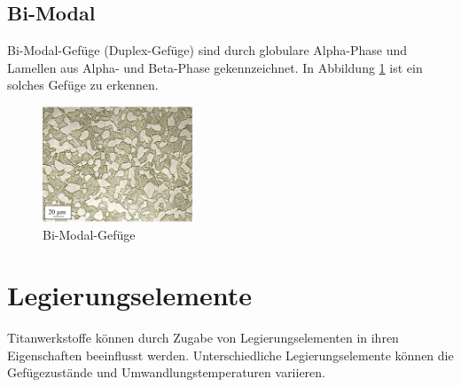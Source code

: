 \documentclass[a4paper, 11pt]{tubsreprt}
\begin{document}
\subsection{Bi-Modal}
Bi-Modal-Gefüge (Duplex-Gefüge) sind durch globulare Alpha-Phase und Lamellen aus Alpha- und Beta-Phase gekennzeichnet. In Abbildung \ref{bimodal} ist ein solches Gefüge zu erkennen. 
\begin{figure}
\centering
\includegraphics[width=0.4\textwidth]{Bilder/Duplexgefuege.PNG}
\caption[Bi-Modal-Gefüge]{Bi-Modal-Gefüge\cite{Werkstoffdesign2012}}
\label{bimodal}
\end{figure}

\section{Legierungselemente}
Titanwerkstoffe können durch Zugabe von Legierungselementen in ihren Eigenschaften beeinflusst werden. 
Unterschiedliche Legierungselemente können die Gefügezustände und Umwandlungstemperaturen variieren. 
\end{document}
